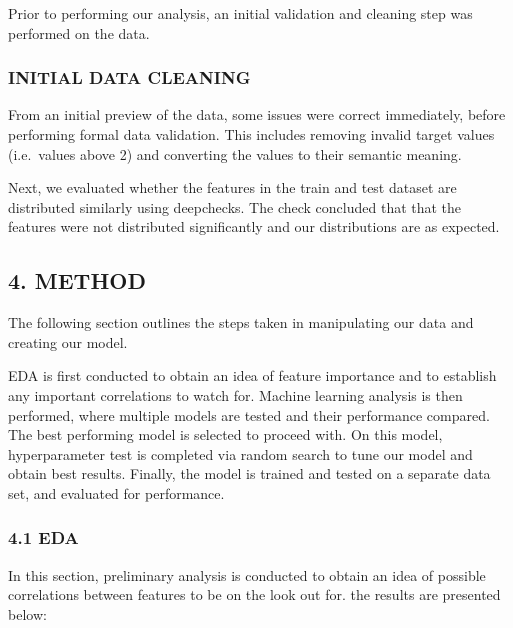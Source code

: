 \documentclass[
  letterpaper,
  DIV=11,
  numbers=noendperiod]{scrartcl}
\begin{document}
Prior to performing our analysis, an initial validation and cleaning
step was performed on the data.

\subsubsection{INITIAL DATA CLEANING}\label{initial-data-cleaning}

From an initial preview of the data, some issues were correct
immediately, before performing formal data validation. This includes
removing invalid target values (i.e.~values above 2) and converting the
values to their semantic meaning.

Next, we evaluated whether the features in the train and test dataset
are distributed similarly using deepchecks. The check concluded that
that the features were not distributed significantly and our
distributions are as expected.

\subsection{4. METHOD}\label{method}

The following section outlines the steps taken in manipulating our data
and creating our model.

EDA is first conducted to obtain an idea of feature importance and to
establish any important correlations to watch for. Machine learning
analysis is then performed, where multiple models are tested and their
performance compared. The best performing model is selected to proceed
with. On this model, hyperparameter test is completed via random search
to tune our model and obtain best results. Finally, the model is trained
and tested on a separate data set, and evaluated for performance.

\subsubsection{4.1 EDA}\label{eda}

In this section, preliminary analysis is conducted to obtain an idea of
possible correlations between features to be on the look out for. the
results are presented below:
\end{document}
